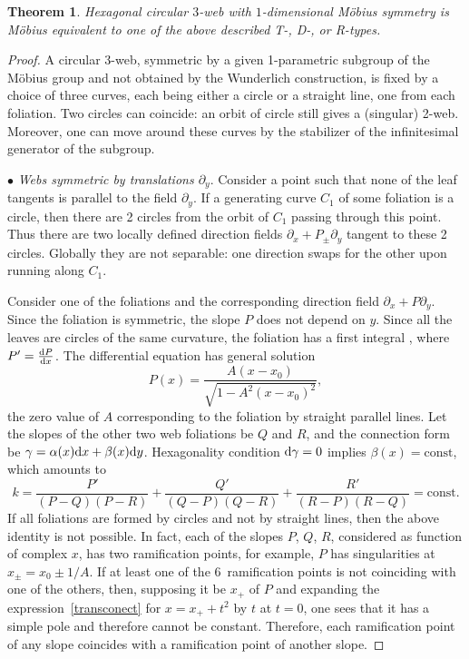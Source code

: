 \documentclass[pdftex]{sigma}
\numberwithin{equation}{section}
\newtheorem{Theorem}{Theorem}[section]
\begin{document}
\begin{Theorem}
Hexagonal circular $3$-web with $1$-dimensional M\"obius symmetry is M\"obius equivalent to one of the above described T-, D-, or R-types.
\end{Theorem}
\begin{proof}
 A circular 3-web, symmetric by a given 1-parametric subgroup of the M\"obius group and not obtained by the Wunderlich construction, is fixed by a choice of three curves, each being either a circle or a straight line, one from each foliation. Two circles can coincide: an orbit of circle still gives a (singular) 2-web. Moreover, one can move around these curves by the stabilizer of the infinitesimal generator of the subgroup.



$\bullet$ {\it Webs symmetric by translations $\partial_y$}.
Consider a point such that none of the leaf tangents is parallel to the field $\partial_y$. If a generating curve $C_1$ of some foliation is a circle, then there are 2 circles from the orbit of $C_1$ passing through this point. Thus there are two locally defined direction fields $\partial_x+P_{\pm}\partial_y$ tangent to these 2 circles. Globally they are not separable: one direction swaps for the other upon running along $C_1$.

Consider one of the foliations and the corresponding direction field $\partial_x+P\partial_y$. Since the foliation is symmetric, the slope $P$ does not depend on $y$. Since all the leaves are circles of the same curvature, the foliation has a first integral
, where $P'=\frac{{\rm d}P}{{\rm d}x}$.
The differential equation
has general solution
\[
P(x)=\frac{A(x-x_0)}{\sqrt{1-A^2(x-x_0)^2}},
\]
the zero value of $A$ corresponding to the foliation by straight parallel lines.
Let the slopes of the other two web foliations be $Q$ and $R$, and the connection form be
$\gamma=\alpha(x){\rm d}x+\beta(x){\rm d}y$. Hexagonality condition ${\rm d}\gamma=0$ implies $\beta(x)=\text{const}$, which amounts to
\begin{equation}\label{transconect}
k=\frac{P'}{(P-Q)(P-R)}+\frac{Q'}{(Q-P)(Q-R)}+\frac{R'}{(R-P)(R-Q)}=\text{const}.
\end{equation}
If all foliations are formed by circles and not by straight lines, then the above identity is not possible. In fact, each of the slopes $P$, $Q$, $R$, considered as function of complex $x$, has two ramification points, for example, $P$ has singularities at $x_{\pm}=x_0\pm 1/A$. If at least one of the 6~ramification points is not coinciding with one of the others, then, supposing it be $x_{+}$ of $P$ and expanding the expression~\eqref{transconect} for $x=x_{+}+t^2$ by $t$ at $t=0$, one sees that it has a simple pole and therefore cannot be constant. Therefore, each ramification point of any slope coincides with a ramification point of another slope.


\end{proof}
\end{document}
